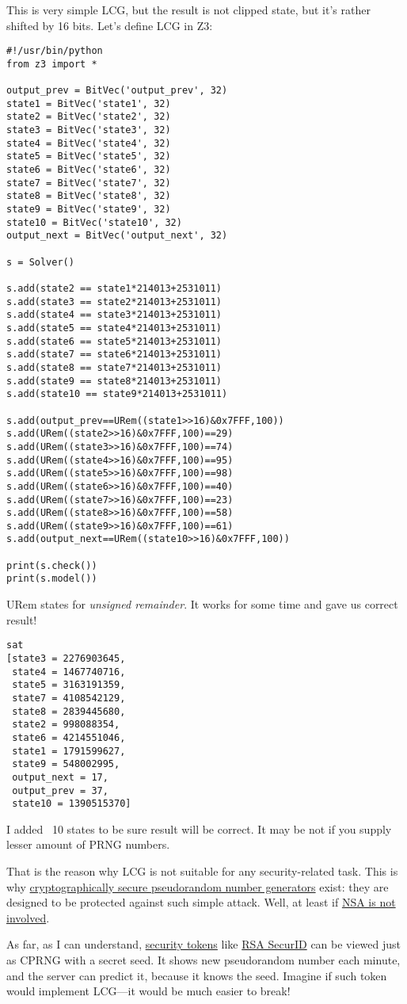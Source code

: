This is very simple LCG, but the result is not clipped state, but it's rather shifted by 16 bits.
Let's define LCG in Z3:

\begin{lstlisting}
#!/usr/bin/python
from z3 import *

output_prev = BitVec('output_prev', 32)
state1 = BitVec('state1', 32)
state2 = BitVec('state2', 32)
state3 = BitVec('state3', 32)
state4 = BitVec('state4', 32)
state5 = BitVec('state5', 32)
state6 = BitVec('state6', 32)
state7 = BitVec('state7', 32)
state8 = BitVec('state8', 32)
state9 = BitVec('state9', 32)
state10 = BitVec('state10', 32)
output_next = BitVec('output_next', 32)

s = Solver()

s.add(state2 == state1*214013+2531011)
s.add(state3 == state2*214013+2531011)
s.add(state4 == state3*214013+2531011)
s.add(state5 == state4*214013+2531011)
s.add(state6 == state5*214013+2531011)
s.add(state7 == state6*214013+2531011)
s.add(state8 == state7*214013+2531011)
s.add(state9 == state8*214013+2531011)
s.add(state10 == state9*214013+2531011)

s.add(output_prev==URem((state1>>16)&0x7FFF,100))
s.add(URem((state2>>16)&0x7FFF,100)==29)
s.add(URem((state3>>16)&0x7FFF,100)==74)
s.add(URem((state4>>16)&0x7FFF,100)==95)
s.add(URem((state5>>16)&0x7FFF,100)==98)
s.add(URem((state6>>16)&0x7FFF,100)==40)
s.add(URem((state7>>16)&0x7FFF,100)==23)
s.add(URem((state8>>16)&0x7FFF,100)==58)
s.add(URem((state9>>16)&0x7FFF,100)==61)
s.add(output_next==URem((state10>>16)&0x7FFF,100))

print(s.check())
print(s.model())
\end{lstlisting}

URem states for \textit{unsigned remainder}.
It works for some time and gave us correct result!

\begin{lstlisting}
sat
[state3 = 2276903645,
 state4 = 1467740716,
 state5 = 3163191359,
 state7 = 4108542129,
 state8 = 2839445680,
 state2 = 998088354,
 state6 = 4214551046,
 state1 = 1791599627,
 state9 = 548002995,
 output_next = 17,
 output_prev = 37,
 state10 = 1390515370]
\end{lstlisting}

I added ~10 states to be sure result will be correct. It may be not if you supply lesser amount of PRNG numbers.

That is the reason why LCG is not suitable for any security-related task.
This is why \href{https://en.wikipedia.org/wiki/Cryptographically_secure_pseudorandom_number_generator}{cryptographically secure pseudorandom number generators} exist: they are designed to be protected against such simple attack.
Well, at least if \href{https://en.wikipedia.org/wiki/Dual_EC_DRBG}{NSA is not involved}.

As far, as I can understand, \href{http://en.wikipedia.org/wiki/Security_token}{security tokens} like \href{http://en.wikipedia.org/wiki/RSA_SecurID}{RSA SecurID} can be viewed just as \ac{CPRNG} with a secret seed.
It shows new pseudorandom number each minute, and the server can predict it, because it knows the seed.
Imagine if such token would implement LCG---it would be much easier to break!


